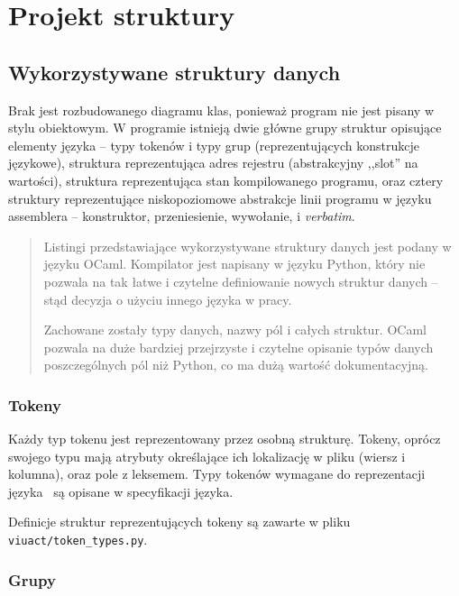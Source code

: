 \section{Projekt struktury}

\subsection{Wykorzystywane struktury danych}

Brak jest rozbudowanego diagramu klas, ponieważ program nie jest pisany w stylu obiektowym.
W programie istnieją dwie główne grupy struktur opisujące elementy języka -- typy tokenów i typy grup
(reprezentujących konstrukcje językowe), struktura reprezentująca adres rejestru (abstrakcyjny ,,slot'' na
wartości), struktura reprezentująca stan kompilowanego programu, oraz cztery struktury reprezentujące
niskopoziomowe abstrakcje linii programu w języku assemblera -- konstruktor, przeniesienie, wywołanie, i
\emph{verbatim}.

\begin{quote}
    Listingi przedstawiające wykorzystywane struktury danych jest podany w języku OCaml.
    Kompilator jest napisany w języku Python, który nie pozwala na tak łatwe i czytelne definiowanie
    nowych struktur danych -- stąd decyzja o użyciu innego języka w pracy.

    Zachowane zostały typy danych, nazwy pól i całych struktur. OCaml pozwala na duże bardziej
    przejrzyste i czytelne opisanie typów danych poszczególnych pól niż Python, co ma dużą
    wartość dokumentacyjną.
\end{quote}

\subsubsection{Tokeny}
\label{diagram_klas_tokeny}

Każdy typ tokenu jest reprezentowany przez osobną strukturę. Tokeny, oprócz swojego typu mają atrybuty
określające ich lokalizację w pliku (wiersz i kolumna), oraz pole z leksemem. Typy tokenów wymagane do
reprezentacji języka \ViuAct\ są opisane w specyfikacji języka.

Definicje struktur reprezentujących tokeny są zawarte w pliku \texttt{viuact/token\_types.py}.

\subsubsection{Grupy}
\label{diagram_klas_grupy}

